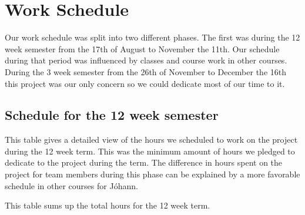 \section{Work Schedule}\label{schedule}
Our work schedule was split into two different phases. The first was during the 12 week semester from the 17th of August to November the 11th. Our schedule during that period was influenced by classes and course work in other courses. During the 3 week semester from the 26th of November to December the 16th this project was our only concern so we could dedicate most of our time to it. 

\subsection{Schedule for the 12 week semester}
  This table gives a detailed view of the hours we scheduled to work on the project during the 12 week term. This was the minimum amount of hours we pledged to dedicate to the project during the term. The difference in hours spent on the project for team members during this phase can be explained by a more favorable schedule in other courses for Jóhann. 

  \noindent

  \noindent This table sums up the total hours for the 12 week term.  
  
  \noindent
  
